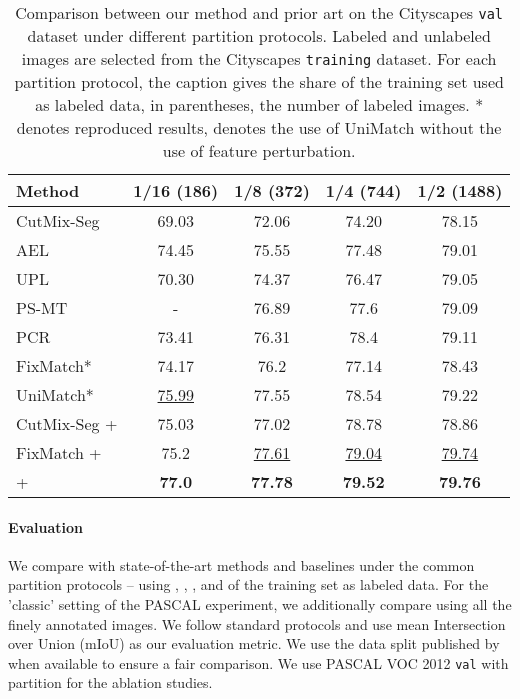 \documentclass{article}
\renewcommand{\cite}[1]{\citep{#1}}
\begin{document}
\begin{table}\centering
\caption{
Comparison between our method and prior art on the Cityscapes \texttt{val} dataset under different partition protocols. 
Labeled and unlabeled images are selected from the Cityscapes \texttt{training} dataset. For each partition protocol, the caption gives the share of the training set used as labeled data, in parentheses, the  number of labeled images.
* denotes reproduced results,  denotes the use of UniMatch \cite{Yang2022RevisitingWC} without the use of feature perturbation.}
\label{tab:city}
\begin{tabular}{lcccc}
\toprule
\textbf{Method} & 
\textbf{1/16 (186)} & \textbf{1/8 (372)} & \textbf{1/4 (744)} & \textbf{1/2 (1488)} \\
\midrule
CutMix-Seg \cite{french2019semi} & 
69.03 & 72.06 & 74.20 & 78.15 \\
AEL \cite{ael}  &
74.45 & 75.55 & 77.48 & 79.01 \\
UPL \cite{wang2022semi}  &
70.30 & 74.37  & 76.47  & 79.05  \\
PS-MT \cite{psmt}  &
- & 76.89  & 77.6  & 79.09 \\
PCR \cite{xu2022semisupervised} &
73.41 & 76.31 & 78.4 & 79.11 \\
FixMatch* \cite{Yang2022RevisitingWC} &
74.17 & 76.2 & 77.14 & 78.43  \\
UniMatch* \cite{Yang2022RevisitingWC} &
\underline{75.99} & 77.55 & 78.54 & 79.22  \\
\midrule
CutMix-Seg + \methodname{} &
75.03 & 
77.02 & 
78.78 & 
78.86 \\

FixMatch + \methodname{}  &
75.2 & 
\underline{77.61} & 
\underline{79.04}  & 
\underline{79.74}  \\

 + \methodname{} &
\textbf{77.0} & 
\textbf{77.78} & 
\textbf{79.52}  & 
\textbf{79.76}  \\
\bottomrule
\end{tabular}
\end{table}


\paragraph{Evaluation}
We compare \methodname{} with state-of-the-art methods and baselines under the common partition protocols -- using , , , and  of the training set as labeled data. For the 'classic' setting of the PASCAL experiment, we additionally compare using all the finely annotated images. 
We follow standard protocols and use mean Intersection over Union (mIoU) as our evaluation metric.
We use the data split published by \citet{wang2022semi} when available to ensure a fair comparison.
We use PASCAL VOC 2012 \texttt{val} with  partition for the ablation studies.
\end{document}
